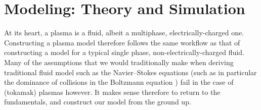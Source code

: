 \section{Modeling: Theory and Simulation}

    At its heart, a plasma is a fluid, albeit a multiphase, electrically-charged one. Constructing a plasma model therefore follows the same workflow as that of constructing a model for a typical single phase, non-electrically-charged fluid. Many of the assumptions that we would traditionally make when deriving traditional fluid model such as the Navier–Stokes equations (such as in particular the dominance of collisions in the Boltzmann equation \BA{[Ref]}) fail in the case of (tokamak) plasmas however. It makes sense therefore to return to the fundamentals, and construct our model from the ground up.


    
    
    
    
